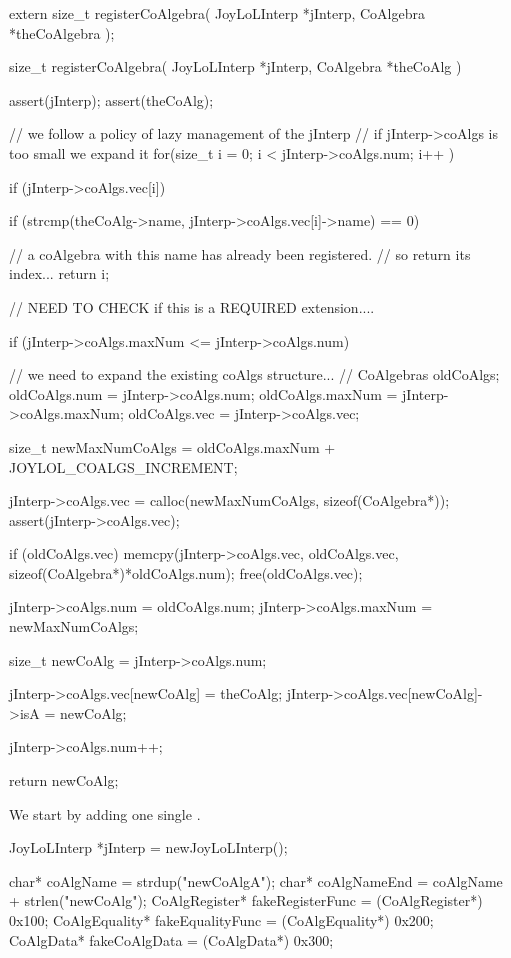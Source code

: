 \startTestSuite[registerCoAlgebra]

\startCHeader
extern size_t registerCoAlgebra(
  JoyLoLInterp *jInterp,
  CoAlgebra *theCoAlgebra
);
\stopCHeader

\startCCode
size_t registerCoAlgebra(
  JoyLoLInterp *jInterp,
  CoAlgebra *theCoAlg
) {
  assert(jInterp);
  assert(theCoAlg);

  // we follow a policy of lazy management of the jInterp
  // if jInterp->coAlgs is too small we expand it
  for(size_t i = 0; i < jInterp->coAlgs.num; i++ ) {
    if (jInterp->coAlgs.vec[i]) {
      if (strcmp(theCoAlg->name,
        jInterp->coAlgs.vec[i]->name) == 0) {
    
        // a coAlgebra with this name has already been registered. 
        // so return its index...
        return i;
      }
    }
  }
  // NEED TO CHECK if this is a REQUIRED extension....
  
  if (jInterp->coAlgs.maxNum <= jInterp->coAlgs.num) {
    // we need to expand the existing coAlgs structure...
    //  
    CoAlgebras oldCoAlgs;
    oldCoAlgs.num    = jInterp->coAlgs.num;
    oldCoAlgs.maxNum = jInterp->coAlgs.maxNum;
    oldCoAlgs.vec    = jInterp->coAlgs.vec;
    
    size_t newMaxNumCoAlgs =
      oldCoAlgs.maxNum + JOYLOL_COALGS_INCREMENT;

    jInterp->coAlgs.vec =
      calloc(newMaxNumCoAlgs, sizeof(CoAlgebra*));
    assert(jInterp->coAlgs.vec);
    
    if (oldCoAlgs.vec) {
      memcpy(jInterp->coAlgs.vec,
        oldCoAlgs.vec,
        sizeof(CoAlgebra*)*oldCoAlgs.num);
      free(oldCoAlgs.vec);
    }
    
    jInterp->coAlgs.num    = oldCoAlgs.num;
    jInterp->coAlgs.maxNum = newMaxNumCoAlgs;
  }
  
  size_t newCoAlg = jInterp->coAlgs.num;
  
  jInterp->coAlgs.vec[newCoAlg]      = theCoAlg;
  jInterp->coAlgs.vec[newCoAlg]->isA = newCoAlg;
  
  jInterp->coAlgs.num++;
  
  return newCoAlg;
}
\stopCCode


We start by adding one single . 

\startCTest
  JoyLoLInterp *jInterp = newJoyLoLInterp();

  char*          coAlgName        = strdup("newCoAlgA");
  char*          coAlgNameEnd     = coAlgName + strlen("newCoAlg");
  CoAlgRegister* fakeRegisterFunc = (CoAlgRegister*) 0x100;
  CoAlgEquality* fakeEqualityFunc = (CoAlgEquality*) 0x200;
  CoAlgData*     fakeCoAlgData    = (CoAlgData*)     0x300;
  
